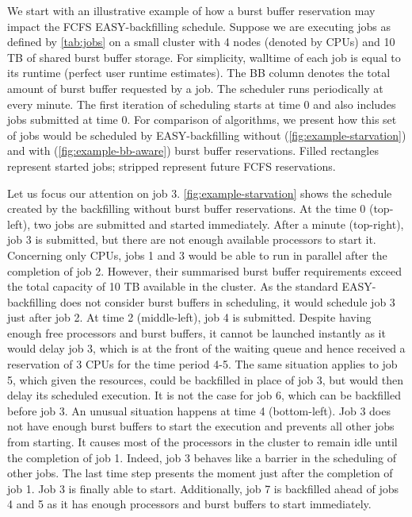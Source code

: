 \documentclass[runningheads]{llncs}
\begin{document}
We start with an illustrative example of how a burst buffer reservation may impact the FCFS EASY-backfilling schedule. Suppose we are executing jobs as defined by \cref{tab:jobs} on a small cluster with 4 nodes (denoted by CPUs) and 10 TB of shared burst buffer storage. %
For simplicity, walltime of each job is equal to its runtime (perfect user runtime estimates). The BB column denotes the total amount of burst buffer requested by a job. The scheduler runs periodically at every minute. The first iteration of scheduling starts at time 0 and also includes jobs submitted at time 0. 
For comparison of algorithms, we present how this set of jobs would be scheduled by EASY-backfilling without (\cref{fig:example-starvation}) and with (\cref{fig:example-bb-aware}) burst buffer reservations.
Filled rectangles represent started jobs; stripped represent future FCFS reservations.


Let us focus our attention on job 3. %
\cref{fig:example-starvation} shows the schedule created by the backfilling without burst buffer reservations. At the time 0 (top-left), two jobs are submitted and started immediately. After a minute (top-right), job 3 is submitted, but there are not enough available processors to start it. Concerning only CPUs, jobs 1 and 3 would be able to run in parallel after the completion of job 2. However, their summarised burst buffer requirements exceed the total capacity of 10 TB available in the cluster. As the standard EASY-backfilling does not consider burst buffers in scheduling, it would schedule job 3 just after job 2. At time 2 (middle-left), job 4 is submitted. Despite having enough free processors and burst buffers, it cannot be launched instantly as it would delay job 3, which is at the front of the waiting queue and hence received a reservation of 3 CPUs for the time period 4-5. The same situation applies to job 5, which given the resources, could be backfilled in place of job 3, but would then delay its scheduled execution. It is not the case for job 6, which can be backfilled before job 3. An unusual situation happens at time 4 (bottom-left). Job 3 does not have enough burst buffers to start the execution and prevents all other jobs from starting. It causes most of the processors in the cluster to remain idle until the completion of job 1. Indeed, job 3 behaves like a barrier in the scheduling of other jobs. The last time step presents the moment just after the completion of job 1. Job 3 is finally able to start. Additionally, job 7 is backfilled ahead of jobs 4 and 5 as it has enough processors and burst buffers to start immediately.
\end{document}
